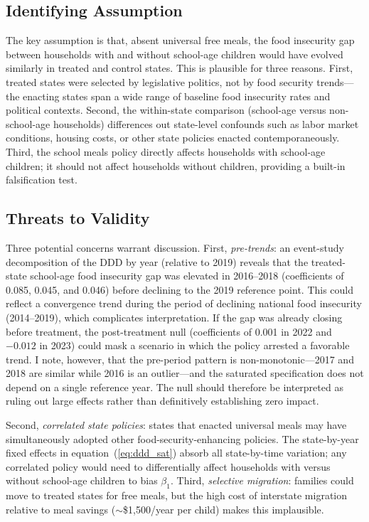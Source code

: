 \documentclass[12pt]{article}
\begin{document}
\subsection{Identifying Assumption}

The key assumption is that, absent universal free meals, the food insecurity gap between households with and without school-age children would have evolved similarly in treated and control states. This is plausible for three reasons. First, treated states were selected by legislative politics, not by food security trends---the enacting states span a wide range of baseline food insecurity rates and political contexts. Second, the within-state comparison (school-age versus non-school-age households) differences out state-level confounds such as labor market conditions, housing costs, or other state policies enacted contemporaneously. Third, the school meals policy directly affects households with school-age children; it should not affect households without children, providing a built-in falsification test.

\subsection{Threats to Validity}

Three potential concerns warrant discussion. First, \emph{pre-trends}: an event-study decomposition of the DDD by year (relative to 2019) reveals that the treated-state school-age food insecurity gap was elevated in 2016--2018 (coefficients of 0.085, 0.045, and 0.046) before declining to the 2019 reference point. This could reflect a convergence trend during the period of declining national food insecurity (2014--2019), which complicates interpretation. If the gap was already closing before treatment, the post-treatment null (coefficients of 0.001 in 2022 and $-0.012$ in 2023) could mask a scenario in which the policy arrested a favorable trend. I note, however, that the pre-period pattern is non-monotonic---2017 and 2018 are similar while 2016 is an outlier---and the saturated specification does not depend on a single reference year. The null should therefore be interpreted as ruling out large effects rather than definitively establishing zero impact.

Second, \emph{correlated state policies}: states that enacted universal meals may have simultaneously adopted other food-security-enhancing policies. The state-by-year fixed effects in equation~(\ref{eq:ddd_sat}) absorb all state-by-time variation; any correlated policy would need to differentially affect households with versus without school-age children to bias $\beta_1$. Third, \emph{selective migration}: families could move to treated states for free meals, but the high cost of interstate migration relative to meal savings ($\sim$\$1,500/year per child) makes this implausible.
\end{document}
